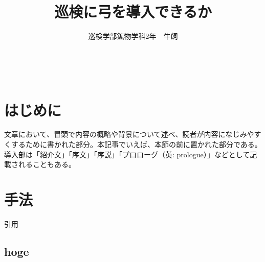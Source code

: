\documentclass{jsarticle}
\title{巡検に弓を導入できるか}
\author{巡検学部鉱物学科2年　牛飼}
\begin{document}
   \maketitle　%

   \begin{multicols}{2}
      \newpage
      \section{はじめに}
      文章において、冒頭で内容の概略や背景について述べ、読者が内容になじみやすくするために書かれた部分。本記事でいえば、本節の前に置かれた部分である。導入部は「紹介文」「序文」「序説」「プロローグ（英: prologue）」などとして記載されることもある。\cite{intro}
      \section{手法}
      引用\cite{inyo}
      \subsection{hoge}

\end{multicols}
\end{document}
